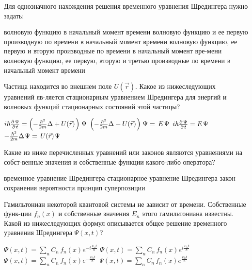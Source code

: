 \documentclass[11pt,a4paper]{exam}
\begin{document}
\begin{questions}
\question Для однозначного нахождения решения временного уравнения Шредингера нужно задать:
\begin{choices}
\choice волновую функцию в начальный момент времени
\choice волновую функцию и ее первую производную по времени в начальный момент времени
\choice волновую функцию, ее первую и вторую производные по времени в начальный момент вре-мени
\choice волновую функцию, ее первую, вторую и третью производные по времени в начальный момент времени
\end{choices}

\question Частица находится во внешнем поле $U(\vec r)$. Какое из нижеследующих уравнений яв-ляется стационарным уравнением Шредингера для энергий и волновых функций стационарных состояний этой частицы?
\begin{choices}
\choice $i\hbar \frac{{\partial {\kern 1pt} \Psi }}{{\partial {\kern 1pt} t}} = \left( { - \frac{{{\hbar ^2}}}{{2m}}\Delta  + U(\vec r){\kern 1pt} } \right){\kern 1pt} \Psi $      
\choice $\left( { - \frac{{{\hbar ^2}}}{{2m}}\Delta  + U(\vec r){\kern 1pt} } \right){\kern 1pt} \Psi  = \,E{\kern 1pt} \Psi $
\choice $i\hbar \frac{{\partial {\kern 1pt} \Psi }}{{\partial {\kern 1pt} t}} = E{\kern 1pt} \Psi $            
\choice $ - \frac{{{\hbar ^2}}}{{2m}}\Delta {\kern 1pt} \Psi  = \,U(\vec r){\kern 1pt} \Psi $ 
\end{choices}

\question Какие из ниже перечисленных уравнений или законов являются уравнениями на собст-венные значения и собственные функции какого-либо оператора?
\begin{choices}
\choice временное уравнение Шредингера    
\choice стационарное уравнение Шредингера
\choice закон сохранения вероятности         
\choice принцип суперпозиции
\end{choices}

\question Гамильтониан некоторой квантовой системы не зависит от времени. Собственные функ-ции ${f_n}(x)$ и собственные значения ${E_n}$ этого гамильтониана известны. Какой из нижеследующих формул описывается общее решение временного уравнения Шредингера $\Psi (x,t)$?
\begin{choices}
\choice $\Psi (x,t) = \sum\limits_n {{C_n}} \,{f_n}(x){e^{ - i\frac{{{E_n}t}}{\hbar }}}$           
\choice $\Psi (x,t) = \sum\limits_n {{C_n}} \,{f_n}(x){e^{i\frac{{{E_n}t}}{\hbar }}}$
\choice $\Psi (x,t) = \sum\limits_n {{C_n}} \,{f_n}(x){e^{ - \frac{{{E_n}t}}{\hbar }}}\,$       
\choice $\Psi (x,t) = \sum\limits_n {{C_n}} \,{f_n}(x){e^{\frac{{{E_n}t}}{\hbar }}}\,$
\end{choices}


\end{questions}
\end{document}
